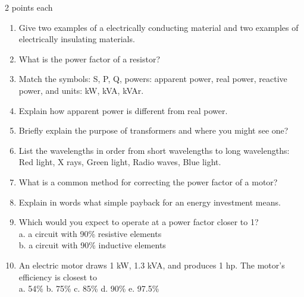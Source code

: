 \documentclass[12pt, oneside]{article}
\begin{document}




\newpage
{}
2 points each

\begin{enumerate}

\item Give two examples of a electrically conducting material and two
examples of electrically insulating materials.
\vfill
\item What is the power factor of a resistor?
\vfill
\item Match the symbols: S, P, Q, powers: apparent power, real power,
reactive power, and units: kW, kVA, kVAr.
\vfill
\item Explain how apparent power is different from real power.
\vfill
\item Briefly explain the purpose of transformers and where you might see one?
\vfill

\newpage
\item List the wavelengths in order from short wavelengths to long
wavelengths: Red light, X rays, Green light, Radio waves, Blue light.
\vfill
\item What is a common method for correcting the power factor of a motor?
\vfill
\item Explain in words what simple payback for an energy investment means.
\vfill
\item Which would you expect to operate at a power factor closer to 1?\\
a. a circuit with 90\% resistive elements\\
b. a circuit with 90\% inductive elements
\vfill
\item An electric motor draws 1 kW, 1.3 kVA, and produces 1 hp.  The
motor’s efficiency is closest to \\
a. 54\% \hfill
b. 75\% \hfill
c. 85\% \hfill
d. 90\% \hfill
e. 97.5\% \\
\vfill


\end{enumerate}
\end{document}
